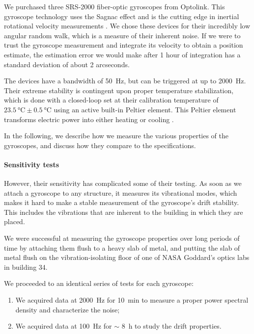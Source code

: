 We purchased three SRS-2000 fiber-optic gyroscopes from Optolink. This gyroscope technology uses the Sagnac effect and is the cutting edge in inertial rotational velocity measurements \citep[for a review of the state-of-the-art see, \textit{e.g.}][]{ElBadaoui:2014fr}. We chose these devices for their incredibly low angular random walk, which is a measure of their inherent noise. If we were to trust the gyroscope measurement and integrate its velocity to obtain a position estimate, the estimation error we would make after 1 hour of integration has a standard deviation of about 2 arcseconds.

The devices have a bandwidth of \SI{50}{\hertz}, but can be triggered at up to \SI{2000}{\hertz}. Their extreme stability is contingent upon proper temperature stabilization, which is done with a closed-loop set at their calibration temperature of $\SI{23.5}{\celsius}\pm\SI{0.5}{\celsius}$ using an active built-in Peltier element. This Peltier element transforms electric power into either heating or cooling \citep{Peltier:1834vu}.

In the following, we describe how we measure the various properties of the gyroscopes, and discuss how they compare to the specifications.

\paragraph{Sensitivity tests}


However, their sensitivity has complicated some of their testing. As soon as we attach a gyroscope to any structure, it measures its vibrational modes, which makes it hard to make a stable measurement of the gyroscope's drift stability. This includes the vibrations that are inherent to the building in which they are placed.

We were successful at measuring the gyroscope properties over long periods of time by attaching them flush to a heavy slab of metal, and putting the slab of metal flush on the vibration-isolating floor of one of NASA Goddard's optics labs in building 34.

We proceeded to an identical series of tests for each gyroscope:
\begin{enumerate}
\item We acquired data at \SI{2000}{\hertz} for \SI{10}{\minute} to measure a proper power spectral density and characterize the noise;
\item We acquired data at \SI{100}{\hertz} for $\sim$ \SI{8}{\hour} to study the drift properties.
\end{enumerate}

